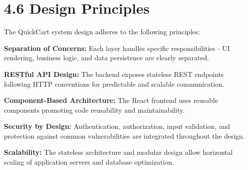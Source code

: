 \documentclass[12pt,a4paper]{report}
\begin{document}
\section*{4.6 Design Principles}

The QuickCart system design adheres to the following principles:

\textbf{Separation of Concerns:} Each layer handles specific responsibilities - UI rendering, business logic, and data persistence are clearly separated.

\textbf{RESTful API Design:} The backend exposes stateless REST endpoints following HTTP conventions for predictable and scalable communication.

\textbf{Component-Based Architecture:} The React frontend uses reusable components promoting code reusability and maintainability.

\textbf{Security by Design:} Authentication, authorization, input validation, and protection against common vulnerabilities are integrated throughout the design.

\textbf{Scalability:} The stateless architecture and modular design allow horizontal scaling of application servers and database optimization.
\end{document}
